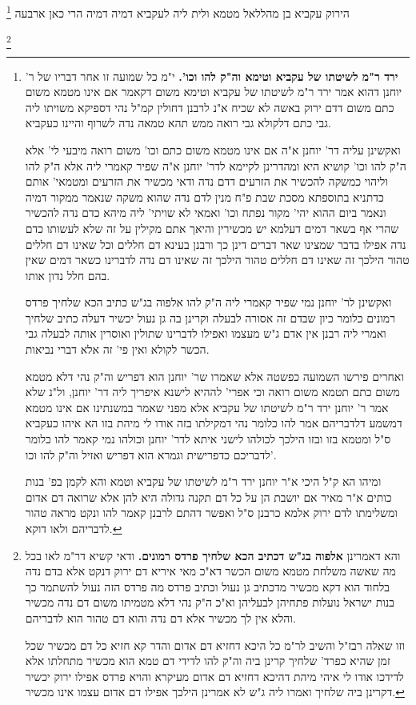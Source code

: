\documentclass[12pt, openany]{book}
\newcommand{\footnotecomment}[1]{
	\renewcommand\thefootnote{}
	\footnote{#1}}
\newcommand{\commenta}[1]{\footnotecomment{#1}}
\begin{document}
{\commenta{\textbf{ירד ר"מ לשיטתו של עקביא וטימא וה"ק להו וכו'.} י"מ כל שמועה זו אחר דבריו של ר' יוחנן דהוא אמר ירד ר"מ לשיטתו של עקביא וטימא משום דקאמר אם אינו מטמא משום כתם משום דדם ירוק באשה לא שכיח א"נ לרבנן דחולין קמ"ל נהי דספיקא משויתו ליה גבי כתם דלקולא גבי רואה ממש תהא טמאה נדה לשרוף והיינו כעקביא.\par ואקשינן עליה דר' יוחנן א"ה אם אינו מטמא משום כתם וכו' משום רואה מיבעי לי' אלא ה"ק להו וכו' קושיא היא ומהדרינן לקיימא לדר' יוחנן א"ה שפיר קאמרי ליה אלא ה"ק להו וליהוי כמשקה להכשיר את הזרעים דדם נדה ודאי מכשיר את הזרעים ומטמאי' אותם כדתניא בתוספתא מסכת שבת פ"ח מנין לדם נדה שהוא משקה שנאמר ממקור דמיה ונאמר ביום ההוא יהי' מקור נפתח וכו' ואמאי לא שויתי' ליה מיהא כדם נדה להכשיר שהרי אף בשאר דמים דעלמא יש מכשירין והיאך אתם מקילין על זה שלא לעשותו כדם נדה אפילו בדבר שמצינו שאר דברים דינן כך ורבנן בעינא דם חללים וכל שאינו דם חללים טהור הילכך זה שאינו דם חללים טהור הילכך זה שאינו דם נדה לדברינו כשאר דמים שאין בהם חלל נדון אותו.\par ואקשינן לר' יוחנן נמי שפיר קאמרי ליה ה"ק להו אלפוה בג"ש כתיב הכא שלחיך פרדס רמונים כלומר כיון שבדם זה אסורה לבעלה וקרינן בה גן נעול יכשיר דעלה כתיב שלחיך ואמרי ליה רבנן אין אדם ג"ש מעצמו ואפילו לדברינו שתולין ואוסרין אותה לבעלה גבי הכשר לקולא ואין פי' זה אלא דברי נביאות.\par ואחרים פירשו השמועה כפשטה אלא שאמרו שר' יוחנן הוא דפריש וה"ק נהי דלא מטמא משום כתם תטמא משום רואה וכי אפרי' לההיא לישנא איפריך ליה דר' יוחנן, ול"נ שלא אמר ר' יוחנן ירד ר"מ לשיטתו של עקביא אלא מפני שאמר במשנתינו אם אינו מטמא דמשמע דלדבריהם אמר להו כלומר נהי דמקילתו בזה אודו לי מיהת בזו הא איהו כעקביא ס"ל ומטמא בזו ובזו הילכך לכולהו לישני איתא לדר' יוחנן וכולהו נמי קאמר להו כלומר לדבריכם כדפרישית וגמרא הוא דפריש ואזיל וה"ק להו וכו'.\par ומיהו הא ק"ל היכי א"ר יוחנן ירד ר"מ לשיטתו של עקביא וטמא והא לקמן בפ' בנות כותים א"ר מאיר אם יושבת הן על כל דם תקנה גדולה היא להן אלא שרואה דם אדום ומשלימתו לדם ירוק אלמא כרבנן ס"ל ואפשר דהתם לרבנן קאמר להו ונקט מראה טהור לדבריהם ולאו דוקא. }
הירוק עקביא בן מהללאל מטמא ולית ליה לעקביא דמיה דמיה הרי כאן ארבעה 
\commenta{ והא דאמרינן \textbf{אלפוה בג"ש דכתיב הכא שלחיך פרדס רמונים.} ודאי קשיא דר"מ לאו בכל מה שאשה משלחת מטמא משום הכשר דא"כ מאי איריא דם ירוק דנקט אלא בדם נדה בלחוד הוא דקא מכשיר מדכתיב גן נעול וכתיב פרדס מה פרדס הזה נעול להשתמר כך בנות ישראל נועלות פתחיהן לבעליהן וא"כ ה"ק נהי דלא מטמיתו משום דם נדה מכשיר והלא אין לך מכשיר אלא דם נדה והוא דם טהור הוא לדבריהם.\par וזו שאלה רבז"ל והשיב לר"מ כל היכא דחזיא דם אדום והדר קא חזיא כל דם מכשיר שכל זמן שהיא כפרד' שלחיך קרינן ביה וה"ק להו לדידי דם טמא הוא מכשיר מתחלתו אלא לדידכו אודו לי איהי מיהת דהיכא דחזיא דם אדום מעיקרא והויא פרדס אפילו ירוק יכשיר דקרינן ביה שלחיך ואמרו ליה ג"ש לא אמרינן הילכך אפילו דם אדום עצמו אינו מכשיר. }
}
\end{document}
